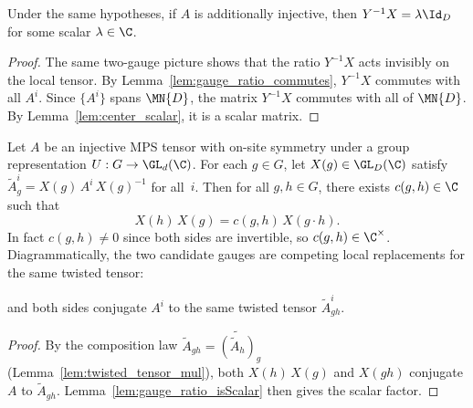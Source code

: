 \begin{lemma}%
    \label{lem:gauge_ratio_isScalar}
    \leanok
    Under the same hypotheses, if $A$ is additionally injective, then
    $Y^{-1} X = \lambda \Id_D$ for some scalar $\lambda \in \C$.
\end{lemma}

\begin{proof}\leanok{}
    The same two-gauge picture shows that the ratio $Y^{-1}X$ acts
    invisibly on the local tensor.
    By Lemma~\ref{lem:gauge_ratio_commutes}, $Y^{-1}X$ commutes with
    all $A^i$.
    Since $\{A^i\}$ spans $\MN{D}$, the matrix $Y^{-1}X$ commutes
    with all of $\MN{D}$.
    By Lemma~\ref{lem:center_scalar}, it is a scalar matrix.
\end{proof}

\begin{theorem}%
    \label{thm:gaugeMatrix_projective_mul}
    \leanok
    Let $A$ be an injective MPS tensor with on-site symmetry under a
    group representation $U : G \to \GL_d(\C)$.
    For each $g \in G$, let $X(g) \in \GL_D(\C)$ satisfy
    $\widetilde{A}_g^i = X(g)\, A^i\, X(g)^{-1}$ for all~$i$.
    Then for all $g, h \in G$, there exists $c(g,h) \in \C$
    such that
    \[
        X(h)\, X(g) = c(g,h)\, X(g \cdot h).
    \]
    In fact $c(g,h) \ne 0$ since both sides are invertible, so
    $c(g,h) \in \C^{\times}$. Diagrammatically, the two candidate gauges
    are competing local replacements for the same twisted tensor:
    \begin{center}
    \end{center}
    and both sides conjugate $A^i$ to the same twisted tensor
    $\widetilde{A}_{gh}^i$.
\end{theorem}

\begin{proof}\leanok
    By the composition law $\widetilde{A}_{gh} = \widetilde{(\widetilde{A}_h)}_g$
    (Lemma~\ref{lem:twisted_tensor_mul}), both $X(h)\,X(g)$ and $X(gh)$
    conjugate $A$ to $\widetilde{A}_{gh}$.
    Lemma~\ref{lem:gauge_ratio_isScalar} then gives the scalar factor.
\end{proof}

